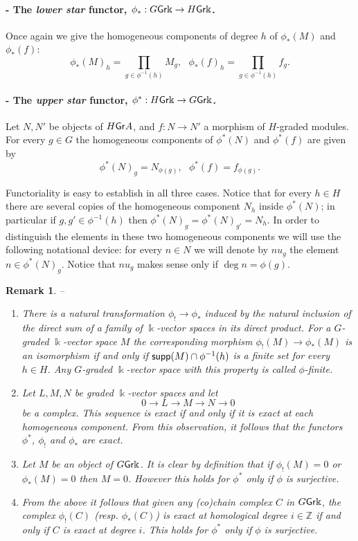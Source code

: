 \documentclass[twoside,11pt]{article}
\renewcommand{\k}{\Bbbk}
\newcommand{\Z}{{\mathbb Z}}
\newcommand{\GrMod}{{\sf Gr}}
\newcommand{\supp}{{\sf supp}}
\newtheorem{subremark}[subtheorem]{Remark}
\begin{document}
\paragraph{- The \emph{lower star} functor, $\phi_*: G \GrMod \k \to H \GrMod \k$.} Once
again we give the homogeneous components of degree $h$ of $\phi_*(M)$ and $\phi_*(f)$:
\[
	\phi_*(M)_h = \prod_{g \in \phi^{-1}(h)}M_g, \ \ \ \phi_*(f)_h = \prod_{g
	\in \phi^{-1}(h)} f_g.
\]

\paragraph{- The \emph{upper star} functor, $\phi^* : H\GrMod \k \to G\GrMod \k$.}
Let $N, N'$ be objects of $H\GrMod A $, and $f: N \to N'$ a morphism of $H$-graded
modules. For every $g \in G$ the homogeneous components of $\phi^*(N)$ and $\phi^*(f)$ are
given by
\[
	\phi^*(N)_g = N_{\phi(g)}, \ \ \ \phi^*(f) = f_{\phi(g)}.
\]

Functoriality is easy to establish in all three cases. Notice that for every $h \in H$
there are several copies of the homogeneous component $N_h$ inside $\phi^*(N)$; in
particular if $g,g' \in \phi^{-1}(h)$ then $\phi^*(N)_g = \phi^*(N)_{g'} = N_h$. In order
to distinguish the elements in these two homogeneous components we will use the following
notational device: for every $n \in N$ we will denote by $n u_g$ the element $n \in
\phi^*(N)_g$. Notice that $n u_g$ makes sense only if $\deg n =\phi(g)$.

\begin{subremark} -- \label{faithful-exact} \rm
\begin{enumerate}
\item There is a natural transformation $\phi_! \to \phi_*$ induced by the natural inclusion
of the direct sum of a family of $\k$-vector spaces in its direct product. For a $G$-graded
$\k$-vector space $M$ the corresponding morphism  $\phi_!(M) \to \phi_*(M)$ is an
isomorphism if and only if $\supp (M) \cap \phi^{-1}(h)$ is a finite set for every $h \in
H$. Any $G$-graded $\k$-vector space with this property is called \emph{$\phi$-finite}. 
\item Let $L,M, N$ be graded $\k$-vector spaces and let
\[
0 \to L \to M \to N \to 0
\]
be a complex. This sequence is exact if and only if it is exact at each homogeneous
component. From this observation, it follows that the functors  $\phi^*$, $\phi_!$ and
$\phi_*$ are exact.
\item Let $M$ be an object of $G\GrMod\k$. It is clear by definition that if $\phi_!(M)=0$
or $\phi_*(M)=0$ then $M=0$. However this holds for $\phi^*$ only if $\phi$ is surjective.
\item From the above it follows that given any (co)chain complex $C$ in $G\GrMod\k$, the
complex $\phi_!(C)$ (resp. $\phi_*(C)$) is exact at homological degree $i\in\Z$ if and
only if $C$ is exact at degree $i$. This holds for $\phi^*$ only if $\phi$ is surjective.
\end{enumerate}
\end{subremark}
\end{document}
